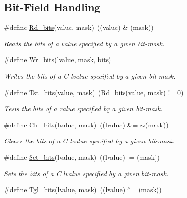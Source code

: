 \subsection*{Bit-\/\+Field Handling}
\begin{DoxyCompactItemize}
\item 
\#define \mbox{\hyperlink{group__group__sam0__utils_ga53d9294b7065346ffa04d7991d2bc31e}{Rd\+\_\+bits}}(value,  mask)~((value) \& (mask))
\begin{DoxyCompactList}\small\item\em Reads the bits of a value specified by a given bit-\/mask. \end{DoxyCompactList}\item 
\#define \mbox{\hyperlink{group__group__sam0__utils_ga97b2bc0b5cdc7ec5293b7a5304cee0f0}{Wr\+\_\+bits}}(lvalue,  mask,  bits)
\begin{DoxyCompactList}\small\item\em Writes the bits of a C lvalue specified by a given bit-\/mask. \end{DoxyCompactList}\item 
\#define \mbox{\hyperlink{group__group__sam0__utils_gab1e92741077b101e6b2df74880e71e96}{Tst\+\_\+bits}}(value,  mask)~(\mbox{\hyperlink{group__group__sam0__utils_ga53d9294b7065346ffa04d7991d2bc31e}{Rd\+\_\+bits}}(value, mask) != 0)
\begin{DoxyCompactList}\small\item\em Tests the bits of a value specified by a given bit-\/mask. \end{DoxyCompactList}\item 
\#define \mbox{\hyperlink{group__group__sam0__utils_gaffbccbb234075f838e181522c864605f}{Clr\+\_\+bits}}(lvalue,  mask)~((lvalue) \&= $\sim$(mask))
\begin{DoxyCompactList}\small\item\em Clears the bits of a C lvalue specified by a given bit-\/mask. \end{DoxyCompactList}\item 
\#define \mbox{\hyperlink{group__group__sam0__utils_ga589436fa123e32e1063488ebd7fdc923}{Set\+\_\+bits}}(lvalue,  mask)~((lvalue) $\vert$=  (mask))
\begin{DoxyCompactList}\small\item\em Sets the bits of a C lvalue specified by a given bit-\/mask. \end{DoxyCompactList}\item 
\#define \mbox{\hyperlink{group__group__sam0__utils_ga9f29d1e990286322697ae8d0f4e365e0}{Tgl\+\_\+bits}}(lvalue,  mask)~((lvalue) $^\wedge$=  (mask))

\end{DoxyCompactItemize}

